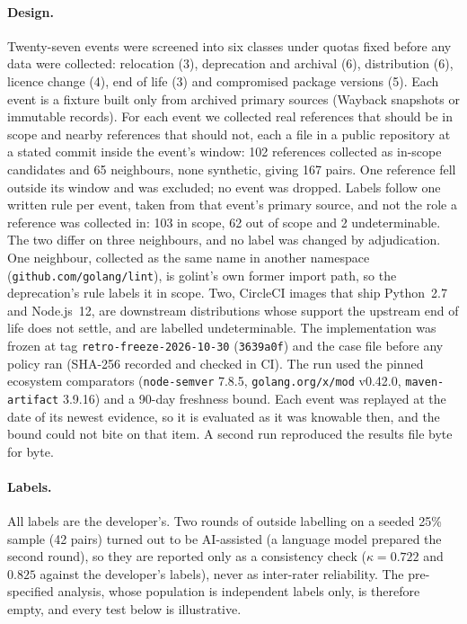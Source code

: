 \documentclass[11pt,a4paper]{article}
\newcommand{\code}[1]{\texttt{#1}}
\begin{document}
\paragraph{Design.} Twenty-seven events were screened into six
classes under quotas fixed before any data were collected: relocation
(3), deprecation and archival (6), distribution (6), licence change
(4), end of life (3) and compromised package versions (5). Each event
is a fixture built only from archived primary sources (Wayback
snapshots or immutable records). For each event we collected
real references that should be in scope and nearby references that
should not, each a file in a public repository at a stated commit
inside the event's window: 102 references collected as in-scope
candidates and 65 neighbours, none synthetic, giving 167 pairs. One
reference fell outside its window and was excluded; no event was
dropped. Labels follow one written rule per event, taken from that
event's primary source, and not the role a reference was collected
in: 103 in scope, 62 out of scope and 2 undeterminable. The two
differ on three neighbours, and no label was changed by adjudication.
One neighbour, collected as the same name in another namespace
(\code{github.com/golang/lint}), is golint's own former import path, so
the deprecation's rule labels it in scope. Two, CircleCI images that
ship Python~2.7 and Node.js~12, are downstream distributions whose
support the upstream end of life does not settle, and are labelled
undeterminable. The implementation was
frozen at tag \code{retro-freeze-2026-10-30} (\code{3639a0f}) and the
case file before any policy ran (SHA-256 recorded and checked in CI).
The run used the pinned ecosystem comparators (\code{node-semver}
7.8.5, \code{golang.org/x/mod} v0.42.0, \code{maven-artifact} 3.9.16)
and a 90-day freshness bound. Each event was replayed at the date of
its newest evidence, so it is evaluated as it was knowable then, and
the bound could not bite on that item. A second run reproduced the
results file byte for byte.

\paragraph{Labels.} All labels are the developer's. Two rounds of
outside labelling on a seeded 25\% sample (42 pairs) turned out to be
AI-assisted (a language model prepared the second round), so they are
reported only as a consistency check ($\kappa = 0.722$ and $0.825$
against the developer's labels), never as inter-rater reliability. The
pre-specified analysis, whose population is independent labels only,
is therefore empty, and every test below is illustrative.
\end{document}
